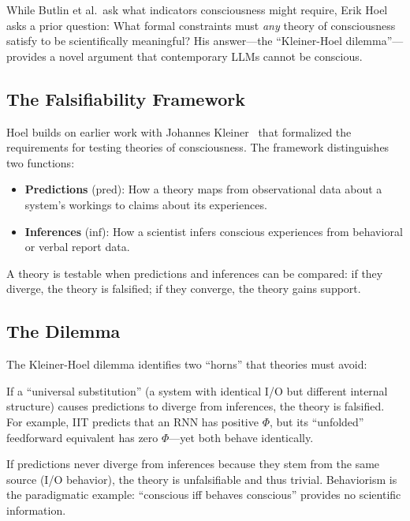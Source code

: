 While Butlin et al.\ ask what indicators consciousness might require, Erik Hoel~\citep{hoel2025disproof} asks a prior question: What formal constraints must \emph{any} theory of consciousness satisfy to be scientifically meaningful? His answer---the ``Kleiner-Hoel dilemma''---provides a novel argument that contemporary LLMs cannot be conscious.

\subsection{The Falsifiability Framework}

Hoel builds on earlier work with Johannes Kleiner~\citep{kleiner2021falsification} that formalized the requirements for testing theories of consciousness. The framework distinguishes two functions:

\begin{itemize}
    \item \textbf{Predictions} ($\text{pred}$): How a theory maps from observational data about a system's workings to claims about its experiences.

    \item \textbf{Inferences} ($\text{inf}$): How a scientist infers conscious experiences from behavioral or verbal report data.
\end{itemize}

A theory is testable when predictions and inferences can be compared: if they diverge, the theory is falsified; if they converge, the theory gains support.

\subsection{The Dilemma}

The Kleiner-Hoel dilemma identifies two ``horns'' that theories must avoid:

\begin{description}[leftmargin=*]
    \item[Horn 1: Substitution Falsification.] If a ``universal substitution'' (a system with identical I/O but different internal structure) causes predictions to diverge from inferences, the theory is falsified. For example, IIT predicts that an RNN has positive $\Phi$, but its ``unfolded'' feedforward equivalent has zero $\Phi$---yet both behave identically.

    \item[Horn 2: Strict Dependency (Triviality).] If predictions never diverge from inferences because they stem from the same source (I/O behavior), the theory is unfalsifiable and thus trivial. Behaviorism is the paradigmatic example: ``conscious iff behaves conscious'' provides no scientific information.
\end{description}

